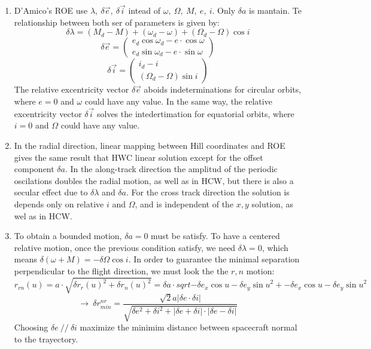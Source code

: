 \documentclass[a4paper]{article}
\begin{document}
\begin{enumerate}[label=\emph{\alph*)}]
  \item %
    D'Amico's ROE use $\lambda,~\delta \vec{e},~\delta \vec{i}$ intead of $\omega,~\Omega,~M,~e,~i$. Only $\delta a$ is mantain. Te relationship between both ser of parameters is given by:
    \[\delta\lambda=(M_d-M)+(\omega_d-\omega)+(\Omega_d-\Omega)\cos{i} \]
    \[\delta\vec{e} = \left( \begin{array}{cc} e_d\cos{\omega_d}-e\cdot\cos{\omega} \\
      e_d\sin{\omega_d}-e\cdot\sin{\omega} \end{array} \right) \]
    \[\delta\vec{i} = \left( \begin{array}{cc} i_d-i \\ (\Omega_d-\Omega)\sin{i} \end{array} \right) \]
    The relative excentricity vector $\delta\vec{e}$ aboids indeterminations for circular orbits, where $e=0$ and $\omega$ could have any value. In the same way, the relative excentricity vector $\delta\vec{i}$ solves the intedertimation for equatorial orbits, where $i=0$ and $\Omega$ could have any value.

  \item %
    In the radial direction, linear mapping between Hill coordinates and ROE gives the same result that HWC linear solution except for the offset component $\delta a$. In the along-track direction the amplitud of the periodic oscilations doubles the radial motion, as well as in HCW, but there is also a secular effect due to $\delta\lambda$ and $\delta a$. For the cross track direction the solution is depends only on relative $i$ and $\Omega$, and is independent of the $x,y$ solution, as wel as in HCW.

  \item %
    To obtain a bounded motion, $\delta a=0$ must be satisfy. To have a centered relative motion, once the previous condition satisfy, we need $\delta \lambda = 0$, which means $\delta(\omega+M)=-\delta\Omega\cos{i}$. In order to guarantee the minimal separation perpendicular to the flight direction, we must look the the $r,n$ motion:
    \[ r_{rn}(u) = a\cdot \sqrt{{\delta r_r(u)}^2+{\delta r_n(u)}^2} = \delta a\cdot sqrt{{-\delta e_x\cos{u}-\delta e_y\sin{u}}^2+{-\delta e_x\cos{u}-\delta e_y\sin{u}}^2} \]
    \[\rightarrow ~\delta r_{min}^{nr} = \frac{\sqrt{2}a|\delta e \cdot \delta i|}{\sqrt{\delta e^2+\delta i^2+|\delta e + \delta i| \cdot |\delta e - \delta i|}} \]
  Choosing $\delta e~//~\delta i$ maximize the minimim distance between spacecraft normal to the trayectory.


\end{enumerate}
\end{document}
